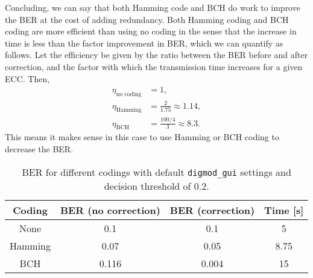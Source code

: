 \documentclass[11pt,titlepage]{report}
\begin{document}
Concluding, we can say that both Hamming code and BCH do work to improve the BER at the cost of adding redundancy. Both Hamming coding and BCH coding are more efficient than using no coding in the sense that the increase in time is less than the factor improvement in BER, which we can quantify as follows. Let the efficiency be given by the ratio between the BER before and after correction, and the factor with which the transmission time increases for a given ECC. Then,
\begin{align*}
\eta_{\text{no coding}}&=1,\\
\eta_{\text{Hamming}}&=\frac{2}{1.75}\approx1.14,\\
\eta_{\text{BCH}}&=\frac{100/4}{3}\approx8.3.
\end{align*}
This means it makes sense in this case to use Hamming or BCH coding to decrease the BER.
\begin{table}[H]
	\centering
	\caption{BER for different codings with default \texttt{digmod\_gui} settings and decision threshold of 0.2.}
	\label{tab:task4-diff-coding}
	\begin{tabular}{c c c c}
		\hline\hline
		Coding & BER (no correction) & BER (correction) & Time [s] \\
		\hline
		None & 0.1 & 0.1 & 5\\
		Hamming & 0.07 & 0.05 & 8.75 \\
		BCH & 0.116 & 0.004 & 15\\
		\hline
	\end{tabular}
\end{table}
\end{document}
